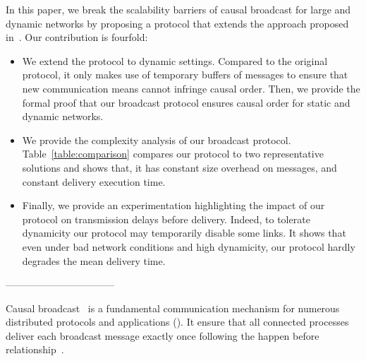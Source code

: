
In this paper, we break the scalability barriers of causal broadcast for large
and dynamic networks by proposing a protocol that extends the approach proposed in~\cite{friedman2004causal}. Our contribution is fourfold:

\begin{itemize}
\item We extend the protocol to dynamic settings. Compared to the
  original protocol, it only makes use of temporary buffers of messages to
  ensure that new communication means cannot infringe causal order. Then,
  we provide the formal proof that our broadcast protocol ensures causal
  order for static and dynamic networks.
\item We provide the complexity analysis of our broadcast
  protocol. Table~\ref{table:comparison} compares our protocol to two representative solutions and shows that, it has constant size overhead on messages, and constant
  delivery execution time.
\item Finally, we provide an experimentation highlighting the impact of our
  protocol on transmission delays before delivery. Indeed, to tolerate dynamicity our protocol may temporarily disable some links. It shows that even under bad
  network conditions and high dynamicity, our protocol hardly degrades the mean delivery time.
\end{itemize}

---------------------------------


Causal broadcast~\cite{hadzilacos1994modular} is a fundamental communication
mechanism for numerous distributed protocols and applications (\REF).
It ensure that all connected processes deliver each broadcast message exactly
once following the happen before
relationship~\cite{lamport1978time,schwarz1994detecting}.


